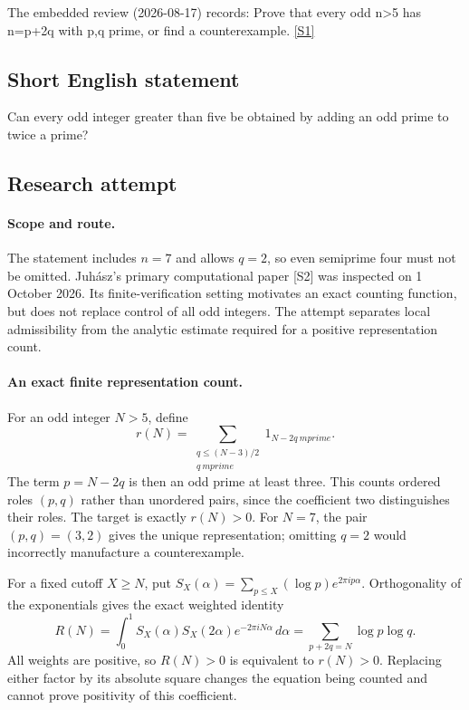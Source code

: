 \documentclass[11pt,a4paper]{article}
\newcommand{\sref}[2]{\hyperlink{source:#1:#2}{[S#2]}}
\begin{document}
The embedded review (2026-08-17) records: Prove that every odd n>5 has n=p+2q with p,q prime, or find a counterexample. \sref{1266}{1}

\subsection{Short English statement}

Can every odd integer greater than five be obtained by adding an odd prime to twice a prime?

\subsection{Research attempt}

\paragraph{Scope and route.}
The statement includes $n=7$ and allows $q=2$, so even semiprime four
must not be omitted. Juh\'asz's primary computational paper [S2] was
inspected on 1 October 2026. Its finite-verification setting motivates
an exact counting function, but does not replace control of all odd
integers. The attempt separates local admissibility from the analytic
estimate required for a positive representation count.

\paragraph{An exact finite representation count.}
For an odd integer $N>5$, define
\[
 r(N)=\sum_{\substack{q\le(N-3)/2\\q\ {
m prime}}}
                 1_{N-2q\ {
m prime}}.
\]
The term $p=N-2q$ is then an odd prime at least three. This counts
ordered roles $(p,q)$ rather than unordered pairs, since the coefficient
two distinguishes their roles. The target is exactly $r(N)>0$.
For $N=7$, the pair $(p,q)=(3,2)$ gives the unique representation;
omitting $q=2$ would incorrectly manufacture a counterexample.

For a fixed cutoff $X\ge N$, put
$S_X(\alpha)=\sum_{p\le X}(\log p)e^{2\pi i p\alpha}$.
Orthogonality of the exponentials gives the exact weighted identity
\[
 R(N)=\int_0^1S_X(\alpha)S_X(2\alpha)e^{-2\pi iN\alpha}\,d\alpha
     =\sum_{p+2q=N}\log p\log q.
\]
All weights are positive, so $R(N)>0$ is equivalent to $r(N)>0$.
Replacing either factor by its absolute square changes the equation
being counted and cannot prove positivity of this coefficient.
\end{document}

